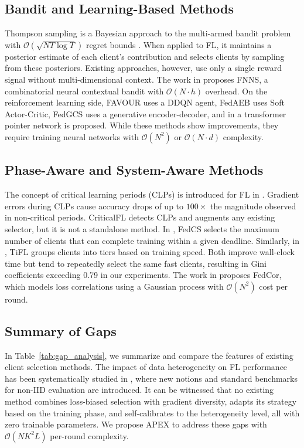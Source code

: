 \documentclass[journal]{IEEEtran}
\begin{document}
\subsection{Bandit and Learning-Based Methods}

Thompson sampling \cite{thompson1933likelihood} is a Bayesian approach to the multi-armed bandit problem with $\mathcal{O}(\sqrt{NT\log T})$ regret bounds \cite{agrawal2012analysis}. When applied to FL, it maintains a posterior estimate of each client's contribution and selects clients by sampling from these posteriors. Existing approaches, however, use only a single reward signal without multi-dimensional context. The work in \cite{ma2025fnns} proposes FNNS, a combinatorial neural contextual bandit with $\mathcal{O}(N \cdot h)$ overhead. On the reinforcement learning side, FAVOUR \cite{wang2020optimizing} uses a DDQN agent, FedAEB \cite{zheng2024fedaeb} uses Soft Actor-Critic, FedGCS \cite{ning2024fedgcs} uses a generative encoder-decoder, and in \cite{dai2025fedhrl} a transformer pointer network is proposed. While these methods show improvements, they require training neural networks with $\mathcal{O}(N^2)$ or $\mathcal{O}(N \cdot d)$ complexity.

\subsection{Phase-Aware and System-Aware Methods}

The concept of critical learning periods (CLPs) is introduced for FL in \cite{yan2023criticalfl}. Gradient errors during CLPs cause accuracy drops of up to $100\times$ the magnitude observed in non-critical periods. CriticalFL detects CLPs and augments any existing selector, but it is not a standalone method. In \cite{nishio2019client}, FedCS selects the maximum number of clients that can complete training within a given deadline. Similarly, in \cite{chai2020tifl}, TiFL groups clients into tiers based on training speed. Both improve wall-clock time but tend to repeatedly select the same fast clients, resulting in Gini coefficients exceeding 0.79 in our experiments. The work in \cite{tang2022fedcor} proposes FedCor, which models loss correlations using a Gaussian process with $\mathcal{O}(N^2)$ cost per round.

\subsection{Summary of Gaps}

In Table~\ref{tab:gap_analysis}, we summarize and compare the features of existing client selection methods. The impact of data heterogeneity on FL performance has been systematically studied in \cite{vahidian2024rethinking}, where new notions and standard benchmarks for non-IID evaluation are introduced. It can be witnessed that no existing method combines loss-biased selection with gradient diversity, adapts its strategy based on the training phase, and self-calibrates to the heterogeneity level, all with zero trainable parameters. We propose APEX to address these gaps with $\mathcal{O}(NK^2L)$ per-round complexity.
\end{document}
